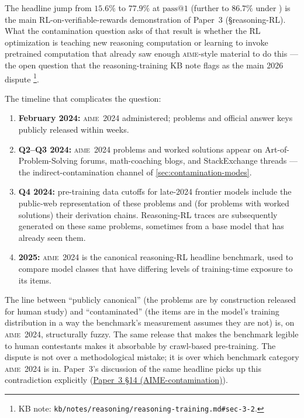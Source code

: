 The headline jump from $15.6\%$ to $77.9\%$ at $\mathrm{pass}@1$
(further to $86.7\%$ under ) is the main
RL-on-verifiable-rewards demonstration of Paper~3 (§reasoning-RL).
What the contamination question asks of that result is whether the RL
optimization is teaching new reasoning computation or learning to
invoke pretrained computation that already saw enough \textsc{aime}-style
material to do this --- the open question that the
reasoning-training KB note flags as the main 2026 dispute%
\footnote{KB note: \nolinkurl{kb/notes/reasoning/reasoning-training.md#sec-3-2}.}.

The timeline that complicates the question:

\begin{enumerate}
\item \textbf{February 2024:} \textsc{aime~2024} administered;
problems and official answer keys publicly released within weeks.
\item \textbf{Q2--Q3 2024:} \textsc{aime~2024} problems and worked
solutions appear on Art-of-Problem-Solving forums, math-coaching
blogs, and StackExchange threads --- the indirect-contamination
channel of \cref{sec:contamination-modes}.
\item \textbf{Q4 2024:} pre-training data cutoffs for late-2024
frontier models include the public-web representation of these
problems and (for problems with worked solutions) their
derivation chains. Reasoning-RL traces are subsequently generated
on these same problems, sometimes from a base model that has
already seen them.
\item \textbf{2025:} \textsc{aime~2024} is the canonical
reasoning-RL headline benchmark, used to compare model classes
that have differing levels of training-time exposure to its
items.
\end{enumerate}

The line between ``publicly canonical'' (the problems are by
construction released for human study) and ``contaminated'' (the
items are in the model's training distribution in a way the
benchmark's measurement assumes they are not) is, on
\textsc{aime~2024}, structurally fuzzy. The same release that makes
the benchmark legible to human contestants makes it absorbable by
crawl-based pre-training. The dispute is not over a methodological
mistake; it is over which benchmark category \textsc{aime~2024} is
in. Paper~3's discussion of the same headline picks up this
contradiction explicitly (\hyperref[P3-sec:contradictions]{Paper~3 §14 (AIME-contamination)}).

